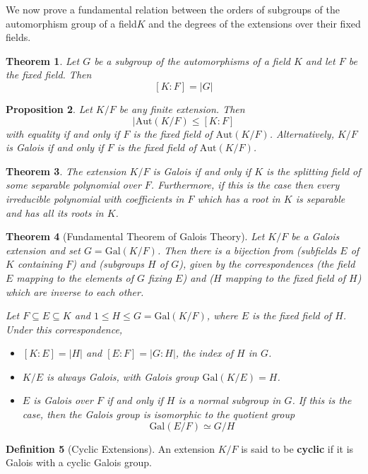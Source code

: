 \documentclass[10pt, oneside, reqno]{amsart}
\theoremstyle{plain}%
\newtheorem{thm}{Theorem}[section]
\newtheorem{prop}[thm]{Proposition}
\theoremstyle{definition}
\newtheorem{defn}[thm]{Definition}
\theoremstyle{remark}
\newcommand{\aut}[1]{\text{Aut}{(#1)}}
\newcommand{\xdeg}[2]{[#1 : #2]}
\newcommand{\gal}[2]{\text{Gal}(#1/#2)}
\begin{document}
We now prove a fundamental relation between the orders of subgroups of the automorphism group of a field$K$ and the degrees of the extensions over their fixed fields.
\begin{thm}
    Let $G$ be a subgroup of the automorphisms of a field $K$ and let $F$ be the fixed field.  Then \[
        \xdeg{K}{F} = |G|
    \]
    
\end{thm}
\begin{prop}
    Let $K/F$ be any finite extension.  Then \[
        | \aut{K/F} \leq \xdeg{K}{F}
    \] with equality if and only if $F$ is the fixed field of $\aut{K/F}$.  Alternatively, $K/F$ is Galois if and only if $F$ is the fixed field of $\aut{K/F}$.
\end{prop}

\begin{thm}
    The extension $K/F$ is Galois if and only if $K$ is the splitting field of some separable polynomial over $F$. Furthermore, if this is the case then every irreducible polynomial with coefficients in $F$ which has a root in $K$ is separable and has all its roots in $K$.
\end{thm}

\begin{thm}[Fundamental Theorem of Galois Theory] Let $K/F$ be a Galois extension and set $G = \gal{K}{F}$.  Then there is a bijection from (subfields $E$ of $K$ containing $F$) and (subgroups $H$ of $G$), given by the correspondences (the field $E$ mapping to the elements of $G$ fixing $E$) and ($H$ mapping to the fixed field of $H$) which are inverse to each other.
    
    Let $F \subseteq E \subseteq K$ and $1 \leq H \leq G = \gal{K}{F}$, where $E$ is the fixed field of $H$. Under this correspondence,
    \begin{itemize}
        \item $\xdeg{K}{E} = |H|$ and $\xdeg{E}{F} = |G:H|$, the index of $H$ in $G$.
        \item $K/E$ is always Galois, with Galois group $\gal{K}{E} = H$.
        \item $E$ is Galois over $F$ if and only if $H$ is a normal subgroup in $G$.  If this is the case, then the Galois group is isomorphic to the quotient group \[
            \gal{E}{F} \simeq G/H
        \]
    \end{itemize}
\end{thm}


\begin{defn}[Cyclic Extensions]
    An extension $K/F$ is said to be \textbf{cyclic} if it is Galois with a cyclic Galois group.
\end{defn}
\end{document}
